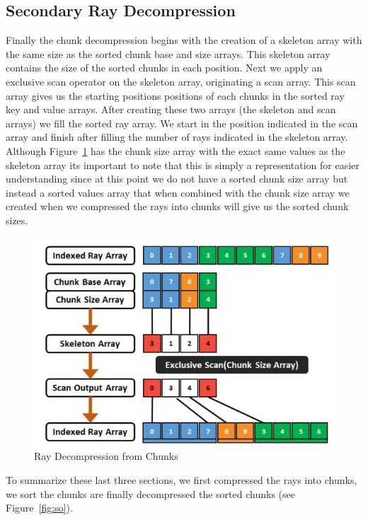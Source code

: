 \subsection{Secondary Ray Decompression}

Finally the chunk decompression begins with the creation of a skeleton array with the same size as the sorted chunk base and size arrays. This skeleton array contains the size of the sorted chunks in each position. Next we apply an exclusive scan operator on the skeleton array, originating a scan array. This scan array gives us the starting positions positions of each chunks in the sorted ray key and value arrays. After creating these two arrays (the skeleton and scan arrays) we fill the sorted ray array. We start in the position indicated in the scan array and finish after filling the number of rays indicated in the skeleton array. Although Figure~\ref{fig:rd} has the chunk size array with the exact same values as the skeleton array its important to note that this is simply a representation for easier understanding since at this point we do not have a sorted chunk size array but instead a sorted values array that when combined with the chunk size array we created when we compressed the rays into chunks will give us the sorted chunk sizes.

\begin{figure}[!htb]
    \centering
    \includegraphics[scale=0.75]{Images/Ray_Decompression}
    \caption{\label{fig:rd}Ray Decompression from Chunks}
\end{figure}

To summarize these last three sections, we first compressed the rays into chunks, we sort the chunks are finally decompressed the sorted chunks (see Figure~\ref{fig:so}).   

